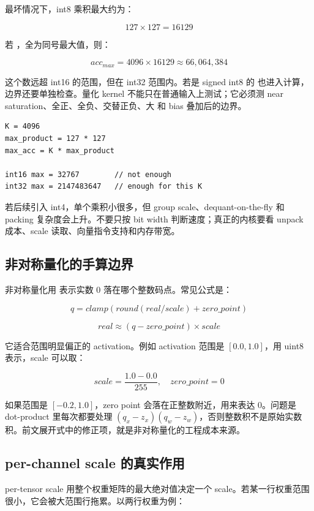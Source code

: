 最坏情况下，int8 乘积最大约为：

\[
127 \times 127 = 16129
\]

若 ，全为同号最大值，则：

\[
acc_{max} = 4096 \times 16129 \approx 66,064,384
\]

这个数远超 int16 的范围，但在 int32 范围内。若是 signed int8 的  也进入计算，边界还要单独检查。量化 kernel 不能只在普通输入上测试；它必须测 near saturation、全正、全负、交替正负、大  和 bias 叠加后的边界。

\begin{lstlisting}[numbers=none,caption={int8 dot-product 的溢出边界}]
K = 4096
max_product = 127 * 127
max_acc = K * max_product

int16 max = 32767        // not enough
int32 max = 2147483647   // enough for this K
\end{lstlisting}

若后续引入 int4，单个乘积小很多，但 group scale、dequant-on-the-fly 和 packing 复杂度会上升。不要只按 bit width 判断速度；真正的内核要看 unpack 成本、scale 读取、向量指令支持和内存带宽。

\subsection{非对称量化的手算边界}

非对称量化用  表示实数 0 落在哪个整数码点。常见公式是：

\[
q = clamp(round(real / scale) + zero\_point)
\]

\[
real \approx (q - zero\_point) \times scale
\]

它适合范围明显偏正的 activation。例如 activation 范围是 \([0.0, 1.0]\)，用 uint8 表示，scale 可以取：

\[
scale = \frac{1.0 - 0.0}{255}, \quad zero\_point = 0
\]

如果范围是 \([-0.2, 1.0]\)，zero point 会落在正整数附近，用来表达 0。问题是 dot-product 里每次都要处理 \((q_x-z_x)(q_w-z_w)\)，否则整数积不是原始实数积。前文展开式中的修正项，就是非对称量化的工程成本来源。

\subsection{per-channel scale 的真实作用}

per-tensor scale 用整个权重矩阵的最大绝对值决定一个 scale。若某一行权重范围很小，它会被大范围行拖累。以两行权重为例：

